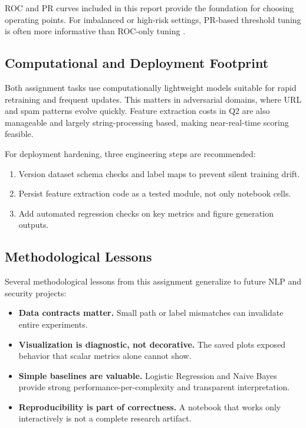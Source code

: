 ROC and PR curves included in this report provide the foundation for choosing operating points. For imbalanced or high-risk settings, PR-based threshold tuning is often more informative than ROC-only tuning \cite{fawcett2006roc}.

\subsection{Computational and Deployment Footprint}

Both assignment tasks use computationally lightweight models suitable for rapid retraining and frequent updates. This matters in adversarial domains, where URL and spam patterns evolve quickly. Feature extraction costs in Q2 are also manageable and largely string-processing based, making near-real-time scoring feasible.

For deployment hardening, three engineering steps are recommended:
\begin{enumerate}
    \item Version dataset schema checks and label maps to prevent silent training drift.
    \item Persist feature extraction code as a tested module, not only notebook cells.
    \item Add automated regression checks on key metrics and figure generation outputs.
\end{enumerate}

\subsection{Methodological Lessons}

Several methodological lessons from this assignment generalize to future NLP and security projects:
\begin{itemize}
    \item \textbf{Data contracts matter.} Small path or label mismatches can invalidate entire experiments.
    \item \textbf{Visualization is diagnostic, not decorative.} The saved plots exposed behavior that scalar metrics alone cannot show.
    \item \textbf{Simple baselines are valuable.} Logistic Regression and Naive Bayes provide strong performance-per-complexity and transparent interpretation.
    \item \textbf{Reproducibility is part of correctness.} A notebook that works only interactively is not a complete research artifact.
\end{itemize}

